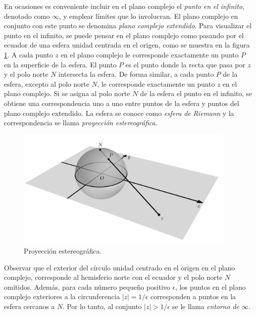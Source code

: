 \documentclass[a4paper]{report}
\begin{document}
En ocasiones es conveniente incluir en el plano complejo el \emph{punto en el infinito}, denotado como \(\infty\), y emplear límites que lo involucran. El plano complejo en conjunto con este punto se denomina \emph{plano complejo extendido}. Para visualizar el punto en el infinito, se puede pensar en el plano complejo como pasando por el ecuador de una esfera unidad centrada en el origen, como se muestra en la figura \ref{fig:point_at_infinity_mayavi_v2_resize}. A cada punto \(z\) en el plano complejo le corresponde exactamente un punto \(P\) en la superficie de la esfera. El punto \(P\) es el punto donde la recta que pasa por \(z\) y el polo norte \(N\) intersecta la esfera. De forma similar, a cada punto \(P\) de la esfera, excepto al polo norte \(N\), le corresponde exactamente un punto \(z\)  en el plano complejo. Si se asigna al polo norte \(N\) de la esfera el punto en el infinito, se obtiene una correspondencia uno a uno entre puntos de la esfera y puntos del plano complejo extendido. La esfera se conoce como \emph{esfera de Riemann} y la correspondencia se llama \emph{proyección estereográfica}.
\begin{figure}[!htb]
 \begin{center}
 \includegraphics[width=0.95\textwidth]{figuras/point_at_infinity_mayavi_v2_resize.pdf}
 \caption{\label{fig:point_at_infinity_mayavi_v2_resize} Proyección estereográfica.}
 \end{center}
\end{figure}


Observar que el exterior del círculo unidad centrado en el origen en el plano complejo, corresponde al hemisferio norte con el ecuador y el polo norte \(N\) omitidos. Además, para cada número pequeño positivo \(\epsilon\), los puntos en el plano complejo exteriores a la circunferencia \(|z|=1/\epsilon\) corresponden a puntos en la esfera cercanos a \(N\). Por lo tanto, al conjunto \(|z|>1/\epsilon\) se le llama \emph{entorno de }\(\infty\).
\end{document}
